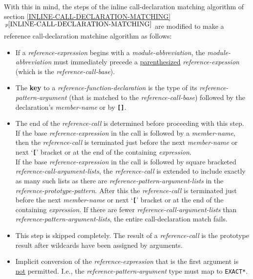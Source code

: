 \documentclass[12pt]{article}
\newcommand{\TT}[1]{{\tt \bfseries #1}}
\newcommand{\key}[1]{{\rm \bfseries #1}}
\newcommand{\itemref}[1]{\ref{#1}$\,^{p\pageref{#1}}$}
\newcommand{\pagnote}[1]{$\,^{p\pageref{#1}}$}
\newenvironment{indpar}[1][0.3in]%
	{\begin{list}{}%
		     {\setlength{\itemsep}{0in}%
		      \setlength{\topsep}{0in}%
		      \setlength{\parsep}{1ex}%
		      \setlength{\labelwidth}{#1}%
		      \setlength{\leftmargin}{#1}%
		      \addtolength{\leftmargin}{\labelsep}}%
	 \item}%
	{\end{list}}
\begin{document}
With this in mind, the steps of the inline call-declaration matching algorithm
of section \itemref{INLINE-CALL-DECLARATION-MATCHING}
are modified to make a reference call-declaration matchine algorithm
as follows:
\begin{indpar}[3em] %
\begin{itemize}

\item[Step \ref{CALL-DECLARATION-MODULE-ABBREVIATION}%
           \pagnote{CALL-DECLARATION-MODULE-ABBREVIATION}]
If a {\em reference-expression} begins with a {\em module-abbreviation},
the {\em module-abbrevi\-ation} must immediately precede a
\underline{parenthesized} {\em reference-expes\-sion} (which is
the {\em reference-call-base}).

\item[Step \ref{CALL-DECLARATION-KEY}%
           \pagnote{CALL-DECLARATION-KEY}]
The \key{key} to a {\em reference-function-declaration} is
the type of its {\em reference-pattern-argument} (that is
matched to the {\em reference-call-base}) followed by the
declaration's {\em member-name} or by \TT{[]}.

\item[Step \ref{CALL-DECLARATION-TERM-NAMES}%
           \pagnote{CALL-DECLARATION-TERM-NAMES}]
The end of the {\em reference-call} is determined before proceeding
with this step.
\\[1ex]
If the base {\em reference-expression} in the call is followed by
a {\em member-name}, then the {\em reference-call} is terminated
just before the next {\em member-name} or next `\TT{[}' bracket
or at the end of the containing {\em expression}.
\\[1ex]
If the base {\em reference-expression} in the call is followed by
square bracketed
{\em reference-call-argument-lists}, the {\em reference-call}
is extended to include exactly as many such lists as there are
{\em reference-pattern-argument-lists} in the
{\em reference-prototype-pattern}.  After this the
{\em reference-call} is terminated
just before the next {\em member-name} or next `\TT{[}' bracket
or at the end of the containing {\em expression}.
If there are fewer {\em reference-call-argument-lists}
than {\em reference-pattern-argument-lists},
the entire call-declaration match fails.

\item[Step \ref{CALL-DECLARATION-TARGET-MATCHING}%
           \pagnote{CALL-DECLARATION-TARGET-MATCHING}]
This step is skipped completely.  The result of a
{\em reference-call} is the prototype result after
wildcards have been assigned by arguments.

\item[Step \ref{CALL-DECLARATION-ARGUMENT-TYPING}%
           \pagnote{CALL-DECLARATION-ARGUMENT-TYPING}]

Implicit conversion of the {\em reference-expression}
that is the first argument is \underline{not} permitted.
I.e., the {\em reference-pattern-argument} type must
map to {\tt *EXACT*}.

\end{itemize}
\end{indpar}
\end{document}
